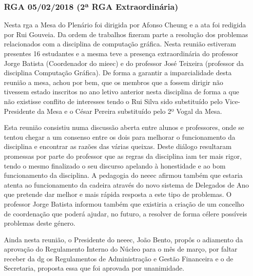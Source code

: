 
\subsubsection{RGA 05/02/2018 (2ª RGA Extraordinária)}

Nesta \acrshort{rga} a Mesa do Plenário foi dirigida por Afonso Cheung e a ata foi redigida por Rui Gouveia. Da ordem de trabalhos fizeram parte a resolução dos problemas relacionados com a disciplina de computação gráfica. Nesta reunião estiveram presentes 16 estudantes e a mesma teve a presença extraordinária do professor Jorge Batista (Coordenador do \acrshort{mieec}) e do professor José Teixeira (professor da disciplina Computação Gráfica). De forma a garantir a imparcialidade desta reunião a mesa, achou por bem, que os membros que a fossem dirigir não tivessem estado inscritos no ano letivo anterior nesta disciplina de forma a que não existisse conflito de interesses tendo o Rui Silva sido substituído pelo Vice-Presidente da Mesa e o César Pereira substituído pelo 2º Vogal da Mesa.

Esta reunião consistiu numa discussão aberta entre alunos e professores, onde se tentou chegar a um consenso entre os dois para melhorar o funcionamento da disciplina e encontrar as razões das várias queixas. Deste diálogo resultaram promessas por parte do professor que as regras da disciplina iam ter mais rigor, tendo o mesmo finalizado o seu discurso apelando à honestidade e ao bom funcionamento da disciplina. A pedagogia do \acrshort{neeec} afirmou também que estaria atenta ao funcionamento da cadeira através do novo sistema de Delegados de Ano que pretende dar melhor e mais rápida resposta a este tipo de problemas. O professor Jorge Batista informou também que existiria a criação de um concelho de coordenação que poderá ajudar, no futuro, a resolver de forma célere possíveis problemas deste género.

Ainda nesta reunião, o Presidente do \acrshort{neeec}, João Bento, propôs o adiamento da aprovação do Regulamento Interno do Núcleo para o mês de março, por faltar receber da \acrshort{dg} os Regulamentos de Administração e Gestão Financeira e o de Secretaria, proposta essa que foi aprovada por unanimidade.